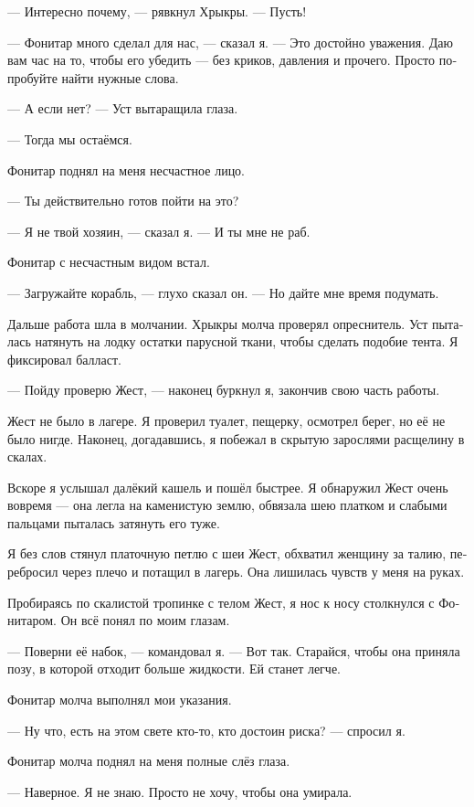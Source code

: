\documentclass[a4paper,12pt,fleqn]{book}\usepackage{polyglossia}\setdefaultlanguage[babelshorthands=true]{russian}\setotherlanguage{english}\defaultfontfeatures{Ligatures=TeX,Mapping=tex-text}
\newcommand{\asterism}{\vspace{1em}{\centering\Large\bfseries$\ast~\ast~\ast$\par}\vspace{1em}}
\begin{document}
--- Интересно почему, --- рявкнул Хрыкры.
--- Пусть!

--- Фонитар много сделал для нас, --- сказал я.
--- Это достойно уважения.
Даю вам час на то, чтобы его убедить --- без криков, давления и прочего.
Просто попробуйте найти нужные слова.

--- А если нет? --- Уст вытаращила глаза.

--- Тогда мы остаёмся.

Фонитар поднял на меня несчастное лицо.

--- Ты действительно готов пойти на это?

--- Я не твой хозяин, --- сказал я.
--- И ты мне не раб.

Фонитар с несчастным видом встал.

--- Загружайте корабль, --- глухо сказал он.
--- Но дайте мне время подумать.

\asterism

Дальше работа шла в молчании.
Хрыкры молча проверял опреснитель.
Уст пыталась натянуть на лодку остатки парусной ткани, чтобы сделать подобие тента.
Я фиксировал балласт.

--- Пойду проверю Жест, --- наконец буркнул я, закончив свою часть работы.

Жест не было в лагере.
Я проверил туалет, пещерку, осмотрел берег, но её не было нигде.
Наконец, догадавшись, я побежал в скрытую зарослями расщелину в скалах.

Вскоре я услышал далёкий кашель и пошёл быстрее.
Я обнаружил Жест очень вовремя --- она легла на каменистую землю, обвязала шею платком и слабыми пальцами пыталась затянуть его туже.

Я без слов стянул платочную петлю с шеи Жест, обхватил женщину за талию, перебросил через плечо и потащил в лагерь.
Она лишилась чувств у меня на руках.

Пробираясь по скалистой тропинке с телом Жест, я нос к носу столкнулся с Фонитаром.
Он всё понял по моим глазам.

\asterism

--- Поверни её набок, --- командовал я.
--- Вот так.
Старайся, чтобы она приняла позу, в которой отходит больше жидкости.
Ей станет легче.

Фонитар молча выполнял мои указания.

--- Ну что, есть на этом свете кто-то, кто достоин риска? --- спросил я.

Фонитар молча поднял на меня полные слёз глаза.

--- Наверное.
Я не знаю.
Просто не хочу, чтобы она умирала.
\end{document}
